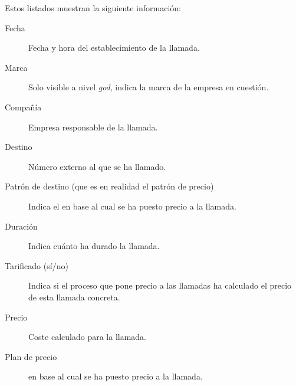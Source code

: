 \documentclass[letterpaper,10pt,spanish]{sphinxmanual}
\begin{document}
Estos listados muestran la siguiente información:
\begin{description}
\item[{Fecha}] \leavevmode{}\label{billing_and_invoices/billable_calls:term-date}
Fecha y hora del establecimiento de la llamada.

\item[{Marca}] \leavevmode{}\label{billing_and_invoices/billable_calls:term-brand}
Solo visible a nivel \emph{god}, indica la marca de la empresa en cuestión.

\item[{Compañía}] \leavevmode{}\label{billing_and_invoices/billable_calls:term-company}
Empresa responsable de la llamada.

\item[{Destino}] \leavevmode{}\label{billing_and_invoices/billable_calls:term-destination}
Número externo al que se ha llamado.

\item[{Patrón de destino (que es en realidad el patrón de precio)}] \leavevmode{}\label{billing_and_invoices/billable_calls:term-pricing-pattern}
Indica el {\hyperref[external_outgoing_calls/noplan_nocall:price\string-pattern]{}} en base al cual se ha puesto precio a la llamada.

\item[{Duración}] \leavevmode{}\label{billing_and_invoices/billable_calls:term-duration}
Indica cuánto ha durado la llamada.

\item[{Tarificado (sí/no)}] \leavevmode{}\label{billing_and_invoices/billable_calls:term-metered-yes-no}
Indica si el proceso que pone precio a las llamadas ha calculado el precio de esta llamada concreta.

\item[{Precio}] \leavevmode{}\label{billing_and_invoices/billable_calls:term-price}
Coste calculado para la llamada.

\item[{Plan de precio}] \leavevmode{}\label{billing_and_invoices/billable_calls:term-pricing-plan}
{\hyperref[external_outgoing_calls/noplan_nocall:price\string-plan]{}} en base al cual se ha puesto precio a la llamada.


\end{description}
\end{document}
